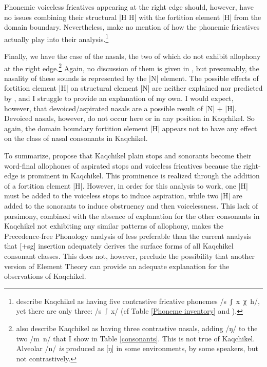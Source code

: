 \documentclass[output=paper,colorlinks,citecolor=brown]{langscibook}
\begin{document}
Phonemic voiceless fricatives appearing at the right edge should, however, have no issues combining their structural |H H| with the fortition element |H| from the domain boundary. Nevertheless, \citet{nasukawa_backley_2018} make no mention of how the phonemic fricatives actually play into their analysis.\footnote{\citet{nasukawa_backley_2018} describe Kaqchikel as having five contrastive fricative phonemes /s~ʃ~x~χ~h/, yet there are only three: /s~ʃ~x/ (cf Table \ref{Phoneme inventory} and \cite{brown_maxwell_little_2006}).}

Finally, we have the case of the nasals, the two of which do not exhibit allophony at the right edge.\footnote{\citet{nasukawa_backley_2018} also describe Kaqchikel as having three contrastive nasals, adding /ŋ/ to the two /m~n/ that I show in Table \ref{consonants}. This is not true of Kaqchikel. Alveolar /n/ \emph{is} produced as [ŋ] in some environments, by some speakers, but not contrastively.} Again, no discussion of them is given in \citet{nasukawa_backley_2018}, but presumably, the nasality of these sounds is represented by the |N| element. The possible effects of fortition element |H| on structural element |N| are neither explained nor predicted by \citet{nasukawa_backley_2018}, and I struggle to provide an explanation of my own. I would expect, however, that devoiced\slash aspirated nasals are a possible result of |N| + |H|. Devoiced nasals, however, do not occur here or in any position in Kaqchikel. So again, the domain boundary fortition element |H| appears not to have any effect on the class of nasal consonants in Kaqchikel.

To summarize, \citet{nasukawa_backley_2018} propose that Kaqchikel plain stops and sonorants become their word-final allophones of aspirated stops and voiceless fricatives because the right-edge is prominent in Kaqchikel. This prominence is realized through the addition of a fortition element |H|. However, in order for this analysis to work, one |H| must be added to the voiceless stops to induce aspiration, while two |H| are added to the sonorants to induce obstruency and then voicelessness. This lack of parsimony, combined with the absence of explanation for the other consonants in Kaqchikel not exhibiting any similar patterns of allophony, makes the Precedence-free Phonology analysis of \citet{nasukawa_backley_2018} less preferable than the current analysis that [+sg] insertion adequately derives the surface forms of all Kaqchikel consonant classes. This does not, however, preclude the possibility that another version of Element Theory can provide an adequate explanation for the observations of Kaqchikel. 
\end{document}
